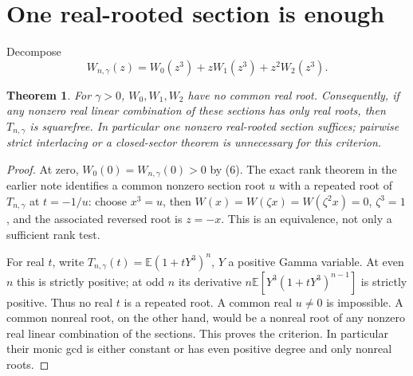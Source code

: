 \documentclass[11pt]{article}
\newtheorem{theorem}{Theorem}
\begin{document}
\section{One real-rooted section is enough}
Decompose
\[
 W_{n,\gamma}(z)=W_0(z^3)+zW_1(z^3)+z^2W_2(z^3).             \tag{8}
\]
\begin{theorem}\label{thm:real}
For $\gamma>0$, $W_0,W_1,W_2$ have no common real root.
Consequently, if any nonzero real linear combination of these sections
has only real roots, then $T_{n,\gamma}$ is squarefree.
In particular one nonzero real-rooted section suffices; pairwise strict
interlacing or a closed-sector theorem is unnecessary for this criterion.
\end{theorem}
\begin{proof}
At zero, $W_0(0)=W_{n,\gamma}(0)>0$ by (6).
The exact rank theorem in the earlier note identifies a common nonzero
section root $u$ with a repeated root of $T_{n,\gamma}$ at $t=-1/u$:
choose $x^3=u$, then $W(x)=W(\zeta x)=W(\zeta^2x)=0$,
$\zeta^3=1$, and the associated reversed root is $z=-x$.
This is an equivalence, not only a sufficient rank test.

For real $t$, write $T_{n,\gamma}(t)=\mathbb E(1+tY^3)^n$,
$Y$ a positive Gamma variable. At even $n$ this is strictly positive;
at odd $n$ its derivative
$n\mathbb E[Y^3(1+tY^3)^{n-1}]$ is strictly positive.
Thus no real $t$ is a repeated root. A common real $u\ne0$ is impossible.
A common nonreal root, on the other hand, would be a nonreal root of
any nonzero real linear combination of the sections. This proves the
criterion. In particular their monic gcd is either constant or has even
positive degree and only nonreal roots.
\end{proof}
\end{document}
